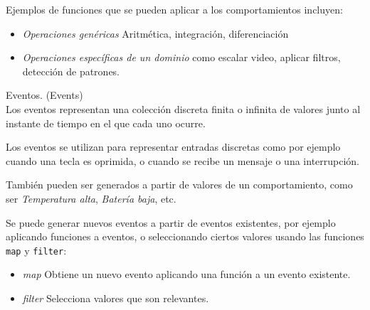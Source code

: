   Ejemplos de funciones que se pueden aplicar a los
comportamientos incluyen:

\begin{itemize}
\item \textit{Operaciones genéricas} Aritmética, integración, diferenciación
\item {
    \textit{Operaciones específicas de un dominio} como escalar video,
    aplicar filtros, detección de patrones.
}
\end{itemize}


\begin{definicion}
  Eventos. (Events)\cite{petersonhudakelliot99:lambdainmotion} \\

  Los eventos representan una colección discreta finita o infinita de valores
  junto al instante de tiempo en el que cada uno ocurre.


\end{definicion}

  Los eventos se utilizan para representar entradas discretas como por
ejemplo cuando una tecla es oprimida, o cuando se recibe un
mensaje o una interrupción.

  También pueden ser generados a partir de valores de un comportamiento,
como ser \emph{Temperatura alta}, \emph{Batería baja}, etc.

  Se puede generar nuevos eventos a partir de eventos existentes, por
ejemplo aplicando funciones a eventos, o seleccionando ciertos valores
usando las funciones \texttt{map} y \texttt{filter}:

\begin{itemize}
  \item {
      \textit{map} Obtiene un nuevo evento aplicando una función
                   a un evento existente.
  }
  \item {
      \textit{filter} Selecciona valores que son relevantes.
  }
\end{itemize}


